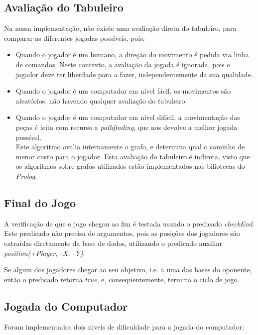 \documentclass[a4paper]{article}
\begin{document}
\subsection{Avaliação do Tabuleiro} Na nossa implementação, não existe uma avaliação direta do tabuleiro, para comparar as diferentes jogadas possíveis, pois:
\begin{itemize}
	\item Quando o jogador é um humano, a direção do movimento é pedida via linha de comandos. Neste contexto, a avaliação da jogada é ignorada, pois o jogador deve ter liberdade para a fazer, independentemente da sua qualidade.
	
	\item Quando o jogador é um computador em nível fácil, os movimentos são aleatórios, não havendo qualquer avaliação do tabuleiro.
	
	\item Quando o jogador é um computador em nível difícil, a movimentação das peças é feita com recurso a \textit{pathfinding}, que nos devolve a melhor jogada possível. \\
Este algoritmo avalia internamente o grafo, e determina qual o caminho de menor custo para o jogador. Esta avaliação do tabuleiro é indireta, visto que os algoritmos sobre grafos utilizados estão implementados nas biliotecas do \textit{Prolog}.
\end{itemize}


\newpage
\subsection{Final do Jogo} A verificação de que o jogo chegou ao fim é testada usando o predicado \mbox{\textit{checkEnd}}. Este predicado não precisa de argumentos, pois as posições dos jogadores são extraídas diretamente da base de dados, utilizando o predicado auxiliar \textit{position(+Player, -X, -Y)}. \par
Se algum dos jogadores chegar ao seu objetivo, i.e. a uma das bases do oponente, então o predicado retorna \textit{true}, e, consequentemente, termina o ciclo de jogo.




\subsection{Jogada do Computador} 

Foram implementados dois niveis de dificuldade para a jogada do computador:
\end{document}
